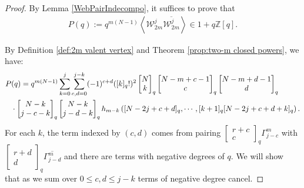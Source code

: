 \documentclass[12pt]{amsart}
\theoremstyle{definition}
\theoremstyle{remark}
\numberwithin{equation}{section}
\numberwithin{figure}{section}
\newcommand{\Z}{\mathbb{Z}}
\begin{document}
\begin{proof}
By Lemma \ref{WebPairIndecompo}, it suffices to prove that
\begin{align*}
    P(q) := q^{m(N-1)} \left\langle \mathcal{W}^j_{2m}\overline{\mathcal{W}^j_{2m}} \right\rangle \in 1 + q\Z[q].
\end{align*}

By Definition \ref{def:2m valent vertex} and Theorem \ref{prop:two-m closed powers}, we have:
\begin{align}\label{eq:two-m direct-expansion}
    P&(q) = q^{m(N-1)} \sum_{k = 0}^j \sum_{c,d = 0}^{j-k} (-1)^{c+d} ([k]_q!)^2
    \begin{bmatrix}N\\k\end{bmatrix}_q  \begin{bmatrix}N-m+c-1\\c\end{bmatrix}_q
    \begin{bmatrix}N-m+d-1\\d\end{bmatrix}_q \\
    & \cdot
    \begin{bmatrix}N-k\\j-c-k\end{bmatrix}_q
    \begin{bmatrix}N-k\\j-d-k\end{bmatrix}_q h_{m-k}\left([N-2j+c+d]_q,\cdots,
    [k+1]_q[N-2j+c+d+k]_q\right) \notag.
\end{align}
For each $k$, the term indexed by $(c,d)$ comes from pairing $ \begin{bmatrix}r+c\\c\end{bmatrix}_q\Gamma_{j-c}^m$ with $ \begin{bmatrix}r+d\\d\end{bmatrix}_q\overline{\Gamma_{j-d}^m}$ and there are terms with negative degrees of $q$. We will show that as we sum over $0 \leq c,d \leq j-k$ terms of negative degree cancel.


\end{proof}
\end{document}
